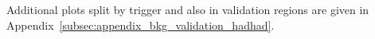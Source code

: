 Additional plots split by trigger and also in validation regions are given in Appendix~\ref{subsec:appendix_bkg_validation_hadhad}.


